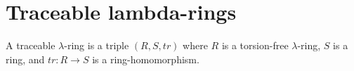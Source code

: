 
\section{Traceable lambda-rings}

\begin{definition}
  A traceable $\lambda$-ring is a triple $(R, S, tr)$ where $R$ is a torsion-free $\lambda$-ring, $S$ is a ring, and $tr: R \to S$ is a ring-homomorphism.  
\end{definition}

